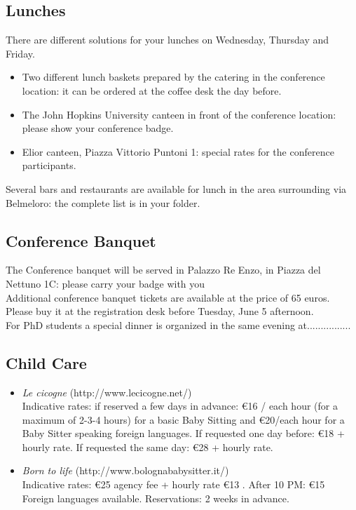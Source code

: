 \begin{multicols}{2}
\subsection*{Lunches}
There are different solutions for your lunches on Wednesday, Thursday and Friday. 
\begin{itemize}
\item Two different lunch baskets prepared by the catering in the conference location: it can be ordered at the coffee desk the day before.
\item The John Hopkins University canteen in front of the conference location: please show your conference badge.
\item Elior canteen, Piazza Vittorio Puntoni 1: special rates for the conference participants.
\end{itemize}
Several bars and restaurants are available for lunch in the area surrounding via Belmeloro: the complete list is in your folder.

\subsection*{Conference Banquet}
The Conference banquet will be served in Palazzo Re Enzo, in Piazza del Nettuno 1C: please carry your badge with you\\ Additional conference banquet tickets are available at the price of 65 euros. Please buy it at the registration desk before Tuesday, June 5 afternoon.\\ For PhD students a special dinner is organized in the same evening at................
\subsection*{Child Care}
\begin{itemize}
\item \emph{Le cicogne} (http://www.lecicogne.net/)\\
Indicative rates: if reserved a few days in advance: \euro 16 / each hour (for a maximum of 2-3-4 hours) for a basic Baby Sitting and \euro 20/each hour for a Baby Sitter speaking foreign languages.
If requested one day before: \euro 18 + hourly rate.
If requested the same day: \euro 28 + hourly rate.
\item \emph{Born to life} (http://www.bolognababysitter.it/)\\
Indicative rates: \euro 25 agency fee + hourly rate \euro 13 . After 10 PM: \euro 15 Foreign languages available. Reservations: 2 weeks in advance.
\end{itemize}

\end{multicols}
